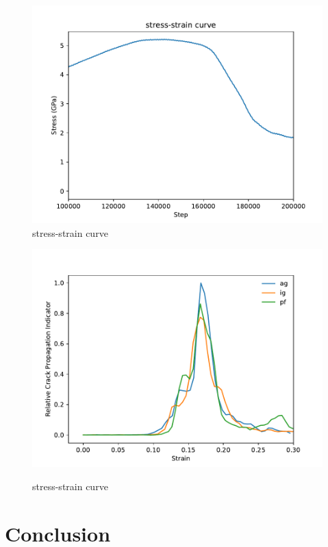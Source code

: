 \documentclass[times]{elsarticle}
\begin{document}
\begin{figure}
	\centering
	\includegraphics[width=0.7\linewidth]{img/agline}
	\caption{stress-strain curve}
	\label{fig:ag_line}
\end{figure}


\begin{figure}
	\centering
	\includegraphics[width=0.7\linewidth]{img/1stdiv}
	\label{fig:surf}
	\caption{stress-strain curve}
\end{figure}


\section{Conclusion}
%


\end{document}

